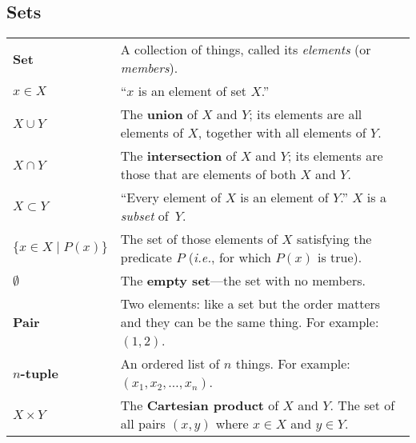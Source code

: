 \documentclass[10pt, a4paper, twocolumn]{article}
\newcommand{\defn}[1]{\textbf{\textsf{#1}}}
\begin{document}
\subsection*{Sets}
\begin{tabularx}{\columnwidth}{@{}p{}>{\raggedright\arraybackslash}X@{}}
  \toprule
  \defn{Set} & A collection of things, called its \emph{elements} (or \emph{members}). \\

  $x \in X$    & ``$x$ is an element of set $X$.'' \\

  $X\cup Y$     & The \defn{union} of $X$ and $Y$; its elements are all
  elements of $X$, together with all elements of $Y$. \\

  $X\cap Y$     & The \defn{intersection} of $X$ and $Y$; its elements are
  those that are elements of both $X$ and $Y$. \\

  $X \subset Y$    & ``Every element of $X$ is an element of $Y$.'' $X$ is a \emph{subset} of~$Y$. \\

  $\{x\in X\mid P(x)\}$ & The set of those elements of $X$ satisfying the
  predicate $P$ (\textit{i.e.}, for which $P(x)$ is true). \\

  $\emptyset$        & The \defn{empty set}---the set with no members. \\

  \defn{Pair} & Two elements: like a set but the order matters and they can be the same thing. For example: $(1, 2)$. \\
  
  \defn{$n$-tuple} & An ordered list of $n$ things. For example: $(x_1, x_2,\dotsc, x_n)$. \\

  $X\times Y$      & The \defn{Cartesian product} of $X$ and $Y$. The set
  of all pairs $(x,y)$ where $x\in X$ and $y \in Y$. \\

\end{tabularx}

\newpage
\end{document}
